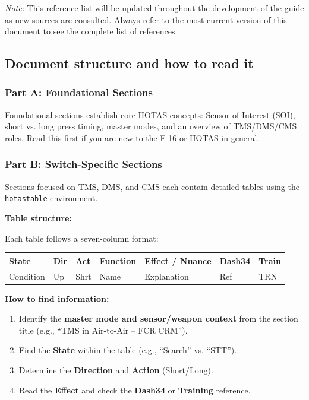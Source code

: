 \documentclass[11pt,a4paper]{article}
\begin{document}
\emph{Note:} This reference list will be updated throughout the development of the guide as new sources are consulted. Always refer to the most current version of this document to see the complete list of references.


\subsection{Document structure and how to read it}

\subsubsection{Part A: Foundational Sections}

Foundational sections establish core HOTAS concepts: Sensor of Interest (SOI), short vs. long press timing, master modes, and an overview of TMS/DMS/CMS roles. Read this first if you are new to the F-16 or HOTAS in general.

\subsubsection{Part B: Switch-Specific Sections}

Sections focused on TMS, DMS, and CMS each contain detailed tables using the \texttt{hotastable} environment.

\textbf{Table structure:}

Each table follows a seven-column format:

\begin{center}
\begin{tabular}{L{1.6cm} L{1.0cm} L{1.0cm} L{3.4cm} L{5.8cm} L{1.4cm} L{1.4cm}}
\toprule
\textbf{State} & \textbf{Dir} & \textbf{Act} & \textbf{Function} & \textbf{Effect / Nuance} & \textbf{Dash34} & \textbf{Train} \\
\midrule
Condition & Up & Shrt & Name & Explanation & Ref & TRN \\
\bottomrule
\end{tabular}
\end{center}

\textbf{How to find information:}

\begin{enumerate}
\item Identify the \textbf{master mode and sensor/weapon context} from the section title (e.g., ``TMS in Air-to-Air -- FCR CRM'').
\item Find the \textbf{State} within the table (e.g., ``Search'' vs. ``STT'').
\item Determine the \textbf{Direction} and \textbf{Action} (Short/Long).
\item Read the \textbf{Effect} and check the \textbf{Dash34} or \textbf{Training} reference.
\end{enumerate}
\end{document}
